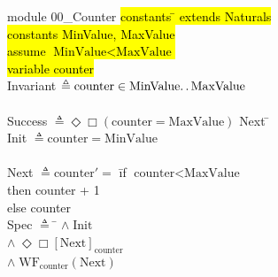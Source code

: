 \documentclass[
  11pt,aspectratio=1610,pdf,hyperref={unicode,colorlinks=false}
]{beamer}
\begin{document}
%
%
\newenvironment{nstabbing}%
{\setlength{\topsep}{0pt}%
  \setlength{\partopsep}{0pt}%
  \tabbing}%
{\endtabbing}

\begin{frame}[c]
  \begin{columns}
  \begin{column}[c]{.6\textwidth}
    \small
    \moduleLeftDash%
    {\sc module} 00\_Counter    
    \moduleRightDash%
    \hl<2>
    \begin{nstabbing}
      {\sc constants} \= \kill
      {\sc extends}   \> Naturals\\
      [0pt \hl<3>]
      {\sc constants} \> MinValue, MaxValue \\
      [0pt \hl<4>]
      {\sc assume}    \> \( \text{MinValue} < \text{MaxValue} \) \\
      [0pt \hl<5>]
      {\sc variable}  \> counter
    \end{nstabbing}
    \begin{nstabbing}
      \\
      [0pt \hl<6>]
      Invariant \= \( \triangleq \text{counter} \in \text{MinValue}\ldotp\ldotp\text{MaxValue} \) \\
      \\
      [0pt \hl<7>]
      Success \> \( \triangleq \Diamond\Box (\text{counter} = \text{MaxValue}) \)
    \end{nstabbing}    
    \begin{nstabbing}
      Next \= \kill \\
      [0pt \hl<8>]
      Init \> \( \triangleq \text{counter} = \text{MinValue} \) \\
      \\
      [0pt \hl<9>]
      Next \> \( \triangleq \text{counter}'= \) \= {\sc if} \( \text{counter} < \text{MaxValue} \) 
      \+ \+ \\      
        {\sc then} counter + 1 \\
        {\sc else} counter \- \- \\
      [0pt \hl<10->]
      Spec \> \( \triangleq \) \= \+ \+ \( \wedge \; \text{Init} \) \\
      [0pt \hl<11->]
        \( \wedge \; \Diamond\Box[\text{Next}]_\text{counter} \) \\
        [0pt \hl<12>]  
        \( \wedge \; \text{WF}_\text{counter}(\text{Next}) \)
    \end{nstabbing}
    \bottombar%
  \end{column}
  \begin{column}[c]{.3\textwidth}
    \centering\resizebox{!}{.9\textheight}{}%
  \end{column}
  \end{columns}
\end{frame}
\end{document}
